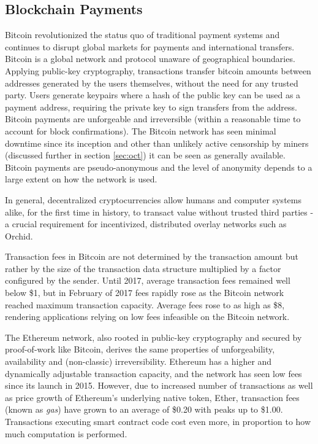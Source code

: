 \subsection{Blockchain Payments}

Bitcoin revolutionized the status quo of traditional payment systems and continues to disrupt global markets for payments and international transfers. Bitcoin is a global network and protocol unaware of geographical boundaries. Applying public-key cryptography, transactions transfer bitcoin amounts between addresses generated by the users themselves, without the need for any trusted party. Users generate keypairs where a hash of the public key can be used as a payment address, requiring the private key to sign transfers from the address\cite{BitcoinTxs}. Bitcoin payments are unforgeable and irreversible\cite{BitcoinReview} (within a reasonable time to account for block confirmations). The Bitcoin network has seen minimal downtime since its inception and other than unlikely active censorship by miners (discussed further in section \ref{sec:oct}) it can be seen as generally available. Bitcoin payments are pseudo-anonymous and the level of anonymity depends to a large extent on how the network is used\cite{BitcoinAnon}.

In general, decentralized cryptocurrencies allow humans and computer systems alike, for the first time in history, to transact value without trusted third parties - a crucial requirement for incentivized, distributed overlay networks such as Orchid.

Transaction fees in Bitcoin are not determined by the transaction amount but rather by the size of the transaction data structure multiplied by a factor configured by the sender. Until 2017, average transaction fees remained well below \$1, but in February of 2017 fees rapidly rose as the Bitcoin network reached maximum transaction capacity. Average fees rose\cite{BitInfoChartsBTC} to as high as \$8, rendering applications relying on low fees infeasible on the Bitcoin network.

The Ethereum network, also rooted in public-key cryptography and secured by proof-of-work like Bitcoin, derives the same properties of unforgeability, availability and (non-classic) irreversibility. Ethereum has a higher and dynamically adjustable transaction capacity, and the network has seen low fees since its launch in 2015. However, due to increased number of transactions as well as price growth of Ethereum's underlying native token, Ether, transaction fees (known as \emph{gas}) have grown\cite{BitInfoChartsETH} to an average of \$0.20 with peaks up to \$1.00. Transactions executing smart contract code cost even more, in proportion to how much computation is performed.

